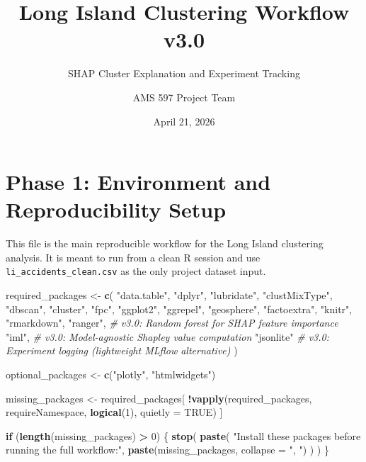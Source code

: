 \documentclass[
]{article}
\title{Long Island Clustering Workflow v3.0}
\subtitle{SHAP Cluster Explanation and Experiment Tracking}
\author{AMS 597 Project Team}
\date{April 21, 2026}
\newenvironment{Shaded}{\begin{snugshade}}{\end{snugshade}}
\newcommand{\AttributeTok}[1]{\textcolor[rgb]{0.13,0.29,0.53}{#1}}
\newcommand{\CommentTok}[1]{\textcolor[rgb]{0.56,0.35,0.01}{\textit{#1}}}
\newcommand{\ConstantTok}[1]{\textcolor[rgb]{0.56,0.35,0.01}{#1}}
\newcommand{\ControlFlowTok}[1]{\textcolor[rgb]{0.13,0.29,0.53}{\textbf{#1}}}
\newcommand{\DecValTok}[1]{\textcolor[rgb]{0.00,0.00,0.81}{#1}}
\newcommand{\FunctionTok}[1]{\textcolor[rgb]{0.13,0.29,0.53}{\textbf{#1}}}
\newcommand{\NormalTok}[1]{#1}
\newcommand{\OtherTok}[1]{\textcolor[rgb]{0.56,0.35,0.01}{#1}}
\newcommand{\SpecialCharTok}[1]{\textcolor[rgb]{0.81,0.36,0.00}{\textbf{#1}}}
\newcommand{\StringTok}[1]{\textcolor[rgb]{0.31,0.60,0.02}{#1}}
\begin{document}
\maketitle

{
\setcounter{tocdepth}{2}
\tableofcontents
}
\section{Phase 1: Environment and Reproducibility
Setup}\label{phase-1-environment-and-reproducibility-setup}

This file is the main reproducible workflow for the Long Island
clustering analysis. It is meant to run from a clean R session and use
\texttt{li\_accidents\_clean.csv} as the only project dataset input.

\begin{Shaded}
\begin{Highlighting}[]
\NormalTok{required\_packages }\OtherTok{\textless{}{-}} \FunctionTok{c}\NormalTok{(}
  \StringTok{"data.table"}\NormalTok{,}
  \StringTok{"dplyr"}\NormalTok{,}
  \StringTok{"lubridate"}\NormalTok{,}
  \StringTok{"clustMixType"}\NormalTok{,}
  \StringTok{"dbscan"}\NormalTok{,}
  \StringTok{"cluster"}\NormalTok{,}
  \StringTok{"fpc"}\NormalTok{,}
  \StringTok{"ggplot2"}\NormalTok{,}
  \StringTok{"ggrepel"}\NormalTok{,}
  \StringTok{"geosphere"}\NormalTok{,}
  \StringTok{"factoextra"}\NormalTok{,}
  \StringTok{"knitr"}\NormalTok{,}
  \StringTok{"rmarkdown"}\NormalTok{,}
  \StringTok{"ranger"}\NormalTok{,     }\CommentTok{\# v3.0: Random forest for SHAP feature importance}
  \StringTok{"iml"}\NormalTok{,        }\CommentTok{\# v3.0: Model{-}agnostic Shapley value computation}
  \StringTok{"jsonlite"}    \CommentTok{\# v3.0: Experiment logging (lightweight MLflow alternative)}
\NormalTok{)}

\NormalTok{optional\_packages }\OtherTok{\textless{}{-}} \FunctionTok{c}\NormalTok{(}\StringTok{"plotly"}\NormalTok{, }\StringTok{"htmlwidgets"}\NormalTok{)}

\NormalTok{missing\_packages }\OtherTok{\textless{}{-}}\NormalTok{ required\_packages[}
  \SpecialCharTok{!}\FunctionTok{vapply}\NormalTok{(required\_packages, requireNamespace, }\FunctionTok{logical}\NormalTok{(}\DecValTok{1}\NormalTok{), }\AttributeTok{quietly =} \ConstantTok{TRUE}\NormalTok{)}
\NormalTok{]}

\ControlFlowTok{if}\NormalTok{ (}\FunctionTok{length}\NormalTok{(missing\_packages) }\SpecialCharTok{\textgreater{}} \DecValTok{0}\NormalTok{) \{}
  \FunctionTok{stop}\NormalTok{(}
    \FunctionTok{paste}\NormalTok{(}
      \StringTok{"Install these packages before running the full workflow:"}\NormalTok{,}
      \FunctionTok{paste}\NormalTok{(missing\_packages, }\AttributeTok{collapse =} \StringTok{", "}\NormalTok{)}
\NormalTok{    )}
\NormalTok{  )}
\NormalTok{\}}


\end{Highlighting}
\end{Shaded}
\end{document}
